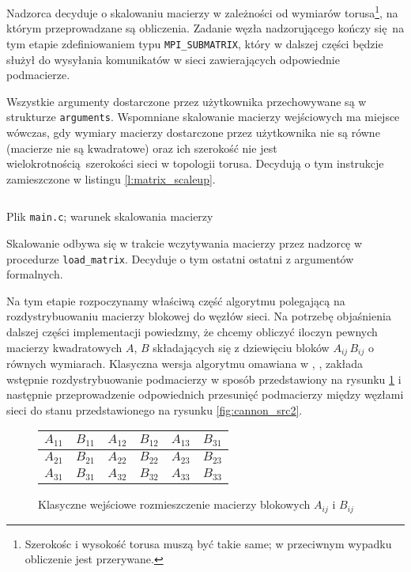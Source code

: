 Nadzorca decyduje o skalowaniu macierzy w zależności od wymiarów torusa\footnote{Szerokośc i wysokość torusa muszą być takie same; w przeciwnym wypadku obliczenie jest przerywane.}, na którym przeprowadzane są obliczenia. Zadanie węzła nadzorującego kończy się na tym etapie zdefiniowaniem typu \texttt{MPI\_SUBMATRIX}, który w dalszej części będzie służył do wysyłania komunikatów w sieci zawierających odpowiednie podmacierze.

Wszystkie argumenty dostarczone przez użytkownika przechowywane są w strukturze \texttt{arguments}. Wspomniane skalowanie macierzy wejściowych ma miejsce wówczas, gdy wymiary macierzy dostarczone przez użytkownika nie są równe (macierze nie są kwadratowe) oraz ich szerokość nie jest wielokrotnością szerokości sieci w topologii torusa. Decydują o tym instrukcje zamieszczone w listingu \ref{l:matrix_scaleup}.

\begin{listing}[H]
\inputminted[fontsize=\footnotesize,bgcolor=bg,linenos,firstnumber=408,firstline=408,lastline=418]{c}{includes/listings/main.c}
\caption{Plik \texttt{main.c}; warunek skalowania macierzy}
\label{l:matrix_scaleup}
\end{listing}

Skalowanie odbywa się w trakcie wczytywania macierzy przez nadzorcę w procedurze \texttt{load\_matrix}. Decyduje o tym ostatni ostatni z argumentów formalnych.

Na tym etapie rozpoczynamy właściwą część algorytmu polegającą na rozdystrybuowaniu macierzy blokowej do węzłów sieci. Na potrzebę objaśnienia dalszej części implementacji powiedzmy, że chcemy obliczyć iloczyn pewnych macierzy kwadratowych \(A\), \(B\) składających się z dziewięciu bloków \(A_{ij}\, B_{ij}\) o równych wymiarach. Klasyczna wersja algorytmu omawiana w \cite{Stpiczynski}, \cite{Czech}, \cite{Golub} zakłada wstępnie rozdystrybuowanie podmacierzy w sposób przedstawiony na rysunku \ref{fig:cannon_src1} i następnie przeprowadzenie odpowiednich przesunięć podmacierzy między węzłami sieci do stanu przedstawionego na rysunku  \ref{fig:cannon_src2}. 
\begin{figure}[H]
\centering
\begin{tabular}{|cc|cc|cc|}
\hline
\(A_{11}\) & \(B_{11}\) & \(A_{12}\) & \(B_{12}\) & \(A_{13}\) & \(B_{31}\) \\
\hline
\(A_{21}\) & \(B_{21}\) & \(A_{22}\) & \(B_{22}\) & \(A_{23}\) & \(B_{23}\) \\
\hline
\(A_{31}\) & \(B_{31}\) & \(A_{32}\) & \(B_{32}\) & \(A_{33}\) & \(B_{33}\) \\
\hline
\end{tabular}
\caption{Klasyczne wejściowe rozmieszczenie macierzy blokowych \(A_{ij}\) i \(B_{ij}\)} 
\label{fig:cannon_src1}
\end{figure}

